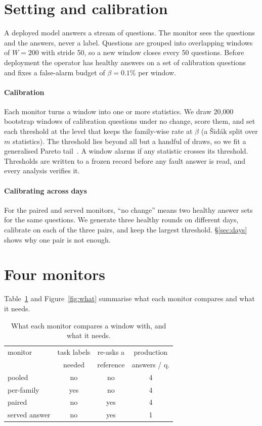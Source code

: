 \documentclass{article}
\begin{document}
\section{Setting and calibration}
\label{sec:method}

A deployed model answers a stream of questions. The monitor sees the questions and
the answers, never a label. Questions are grouped into overlapping windows of
$W=200$ with stride 50, so a new window closes every 50 questions. Before
deployment the operator has healthy answers on a set of calibration questions and
fixes a false-alarm budget of $\beta=0.1\%$ per window.

\paragraph{Calibration} Each monitor turns a window into one or more statistics. We
draw 20{,}000 bootstrap windows of calibration questions under no change, score
them, and set each threshold at the level that keeps the family-wise rate at
$\beta$ (a Šidák split over $m$ statistics). The threshold lies beyond all but a
handful of draws, so we fit a generalised Pareto tail~\citep{pickands1975statistical}.
A window alarms if any statistic crosses its threshold. Thresholds are written to a
frozen record before any fault answer is read, and every analysis verifies it.

\paragraph{Calibrating across days} For the paired and served monitors, ``no
change'' means two healthy answer sets for the same questions. We generate three
healthy rounds on different days, calibrate on each of the three pairs, and keep
the largest threshold. \S\ref{sec:days} shows why one pair is not enough.

\section{Four monitors}
\label{sec:monitors}

Table~\ref{tab:what} and Figure~\ref{fig:what} summarise what each monitor
compares and what it needs.

\begin{table}[t]
  \centering\small
  \caption{What each monitor compares a window with, and what it needs.}
  \label{tab:what}
  \setlength{\tabcolsep}{3pt}
  \begin{tabular}{lccc}
    \toprule
    monitor & task labels & re-asks a & production \\
            & needed      & reference & answers / q. \\
    \midrule
    pooled        & no  & no  & 4 \\
    per-family    & yes & no  & 4 \\
    paired        & no  & yes & 4 \\
    served answer & no  & yes & 1 \\
    \bottomrule
  \end{tabular}
\end{table}
\end{document}
